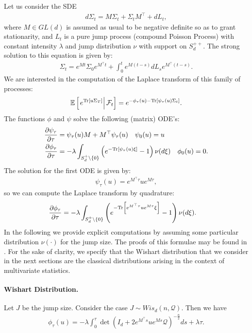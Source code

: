 Let us consider the SDE
\begin{align}
d\Sigma_t=M\Sigma_t+\Sigma_tM^{\top}+dL_t,
\end{align}
where $M\in GL(d)$ is assumed as usual to be negative definite so as to grant stationarity, and $L_t$ is a pure jump process (compound Poisson Process) with constant intensity $\lambda$ and jump distribution $\nu$ with support on $S_d^{++}$.
The strong solution to this equation is given by:
\begin{align}
\Sigma_t=e^{Mt}\Sigma_0e^{M^{\top}t}+\int_{0}^{t}{e^{M(t-s)}dL_se^{M^{\top}(t-s)}}.
\end{align}
We are interested in the computation of the Laplace transform of this family of processes:
\begin{align}
\mathbb{E}\left[\left.e^{\textup{Tr}\left[u\Sigma_T\right]}\right|\mathcal{F}_t\right]=e^{-\phi_\tau(u)-\textup{Tr}\left[\psi_\tau(u)\Sigma_t\right]}.
\end{align}
The functions $\phi$ and $\psi$ solve the following (matrix) ODE's:
\begin{align}
\frac{\partial \psi_{{\tau}}}{\partial \tau}&=\psi_\tau(u)M+M^{\top}\psi_\tau(u)\quad\psi_0(u)=u\\
\frac{\partial \phi_{{\tau}}}{\partial \tau}&=-\lambda\int_{S_d^+\setminus\left\{0\right\}}{\left(e^{-\textup{Tr}\left[\psi_\tau(u)\xi\right]}-1\right)\nu(d\xi)}\quad\phi_0(u)=0.
\end{align}
The solution for the first ODE is given by:
\begin{align}
\psi_\tau(u)=e^{M^{\top}\tau}ue^{M\tau},
\end{align}
so we can compute the Laplace transform by quadrature:
\begin{align}
\frac{\partial \phi_{\tau}}{\partial \tau}&=-\lambda\int_{S_d^+\setminus\left\{0\right\}}{\left(e^{-\textup{Tr}\left[e^{M^{\top}\tau}ue^{M\tau}\xi\right]}-1\right)\nu(d\xi)}.
\end{align}
In the following we provide explicit computations by assuming some particular distribution $\nu(\cdot)$ for the jump size. The proofs of this formulae may be found in \cite{book_GuptaNagar2000}. For the sake of clarity, we specify that the Wishart distribution that we consider in the next sections are the classical distributions arising in the context of multivariate statistics.\\

\paragraph{\textbf{Wishart Distribution.}}
Let $J$ be the jump size. Consider the case $J\sim Wis_d\left(n,\mathcal{Q}\right)$. Then we have
\begin{align}
\phi_\tau(u)=-\lambda\int_{0}^{\tau}{\det\left(I_d+2e^{M^{\top}s}ue^{Ms}\mathcal{Q}\right)^{-\frac{n}{2}}ds}+\lambda \tau.
\end{align}
